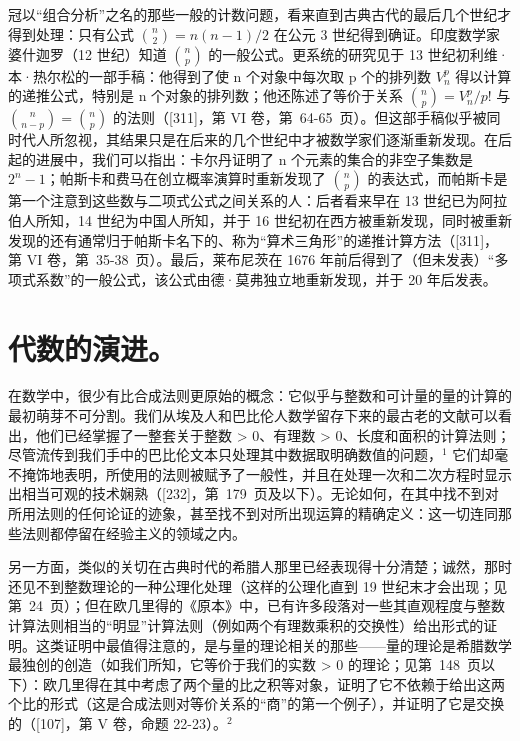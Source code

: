 冠以“组合分析”之名的那些一般的计数问题，看来直到古典古代的最后几个世纪才得到处理：只有公式 \(\binom{n}{2}=n(n-1)/2\) 在公元 3 世纪得到确证。印度数学家婆什迦罗（12 世纪）知道 \(\binom{n}{p}\) 的一般公式。更系统的研究见于 13 世纪初利维·本·热尔松的一部手稿：他得到了使 n 个对象中每次取 p 个的排列数 \(V_{n}^{p}\) 得以计算的递推公式，特别是 n 个对象的排列数；他还陈述了等价于关系 \(\binom{n}{p}=V_{n}^{p}/p!\) 与 \(\binom{n}{n-p}=\binom{n}{p}\) 的法则（{[}311{]}，第 VI 卷，第~64-65~页）。但这部手稿似乎被同时代人所忽视，其结果只是在后来的几个世纪中才被数学家们逐渐重新发现。在后起的进展中，我们可以指出：卡尔丹证明了 n 个元素的集合的非空子集数是 \(2^{n}-1\)；帕斯卡和费马在创立概率演算时重新发现了 \(\binom{n}{p}\) 的表达式，而帕斯卡是第一个注意到这些数与二项式公式之间关系的人：后者看来早在 13 世纪已为阿拉伯人所知，14 世纪为中国人所知，并于 16 世纪初在西方被重新发现，同时被重新发现的还有通常归于帕斯卡名下的、称为“算术三角形”的递推计算方法（{[}311{]}，第 VI 卷，第~35-38~页）。最后，莱布尼茨在 1676 年前后得到了（但未发表）“多项式系数”的一般公式，该公式由德·莫弗独立地重新发现，并于 20 年后发表。

\chapter{代数的演进。}

在数学中，很少有比合成法则更原始的概念：它似乎与整数和可计量的量的计算的最初萌芽不可分割。我们从埃及人和巴比伦人数学留存下来的最古老的文献可以看出，他们已经掌握了一整套关于整数 \textgreater{} 0、有理数 \textgreater{} 0、长度和面积的计算法则；尽管流传到我们手中的巴比伦文本只处理其中数据取明确数值的问题，\(^{1}\) 它们却毫不掩饰地表明，所使用的法则被赋予了一般性，并且在处理一次和二次方程时显示出相当可观的技术娴熟（{[}232{]}，第~179~页及以下）。无论如何，在其中找不到对所用法则的任何论证的迹象，甚至找不到对所出现运算的精确定义：这一切连同那些法则都停留在经验主义的领域之内。

另一方面，类似的关切在古典时代的希腊人那里已经表现得十分清楚；诚然，那时还见不到整数理论的一种公理化处理（这样的公理化直到 19 世纪末才会出现；见第~24~页）；但在欧几里得的《原本》中，已有许多段落对一些其直观程度与整数计算法则相当的“明显”计算法则（例如两个有理数乘积的交换性）给出形式的证明。这类证明中最值得注意的，是与量的理论相关的那些——量的理论是希腊数学最独创的创造（如我们所知，它等价于我们的实数 \textgreater{} 0 的理论；见第~148~页以下）：欧几里得在其中考虑了两个量的比之积等对象，证明了它不依赖于给出这两个比的形式（这是合成法则对等价关系的“商”的第一个例子），并证明了它是交换的（{[}107{]}，第 V 卷，命题 22-23）。\(^{2}\)


